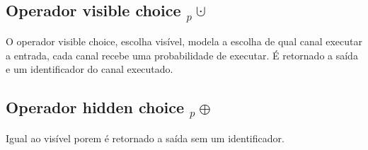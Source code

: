 \subsection*{Operador visible choice ${}_p{\cupdot}$}  
O operador visible choice, escolha visível, modela a escolha de qual canal executar a entrada, cada canal recebe uma probabilidade de executar. É retornado a saída e um identificador do canal executado.
\subsection*{Operador hidden choice ${}_p{\oplus}$}  
Igual ao visível porem é retornado a saída sem um identificador.
